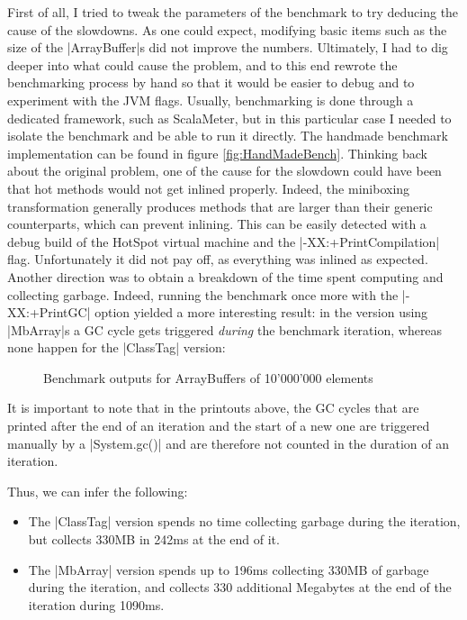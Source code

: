 First of all, I tried to tweak the parameters of the benchmark to try deducing the cause of the slowdowns. As one could expect, modifying basic items such as the size of the |ArrayBuffer|s did not improve the numbers. Ultimately, I had to dig deeper into what could cause the problem, and to this end rewrote the benchmarking process by hand so that it would be easier to debug and to experiment with the JVM flags. Usually, benchmarking is done through a dedicated framework, such as ScalaMeter, but in this particular case I needed to isolate the benchmark and be able to run it directly. The handmade benchmark implementation can be found in figure \ref{fig:HandMadeBench}. Thinking back about the original problem, one of the cause for the slowdown could have been that hot methods would not get inlined properly. Indeed, the miniboxing transformation generally produces methods that are larger than their generic counterparts, which can prevent inlining. This can be easily detected with a debug build of the HotSpot virtual machine and the |-XX:+PrintCompilation| flag. Unfortunately it did not pay off, as everything was inlined as expected. Another direction was to obtain a breakdown of the time spent computing and collecting garbage. Indeed, running the benchmark once more with the |-XX:+PrintGC| option yielded a more interesting result: in the version using |MbArray|s a GC cycle gets triggered \emph{during} the benchmark iteration, whereas none happen for the |ClassTag| version:

\begin{figure}[!h]
\caption{Benchmark outputs for ArrayBuffers of 10'000'000 elements}
\label{fig:GcComp}
\end{figure}

It is important to note that in the printouts above, the GC cycles that are printed after the end of an iteration and the start of a new one are triggered manually by a |System.gc()| and are therefore not counted in the duration of an iteration. 

Thus, we can infer the following:

\begin{itemize}
  \item The |ClassTag| version spends no time collecting garbage during the iteration, but collects 330MB in 242ms at the end of it.
  \item The |MbArray| version spends up to 196ms collecting 330MB of garbage during the iteration, and collects 330 additional Megabytes at the end of the iteration during 1090ms. 
\end{itemize}


